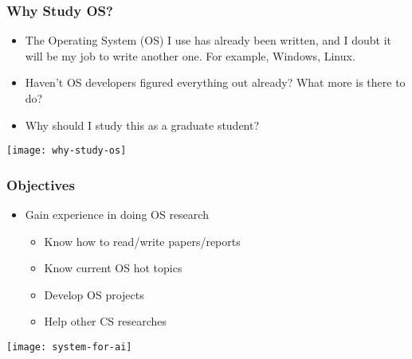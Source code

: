 \begin{frame}[plain]

\frametitle{Why Study OS?}

\begin{itemize}
	
	\item The Operating System (OS) I use has already been written, and I doubt it will be my job to write another one. For example, Windows, Linux. \pause
	\item Haven't OS developers figured everything out already? What more is there to do? \pause
	\item Why should I study this as a graduate student?

\end{itemize}
	\centering
	\texttt{[image: why-study-os]}
\end{frame}
\begin{frame}[plain]	
	\frametitle{Objectives}

\begin{itemize}\Large 
	\item Gain experience in doing OS research
	
	\begin{itemize}\large 
		\item Know how to read/write papers/reports
		\item Know current OS hot topics
		\item Develop OS projects \pause
		\item Help other CS researches
	\end{itemize}
\end{itemize}
	\centering
	\texttt{[image: system-for-ai]}
\end{frame}

